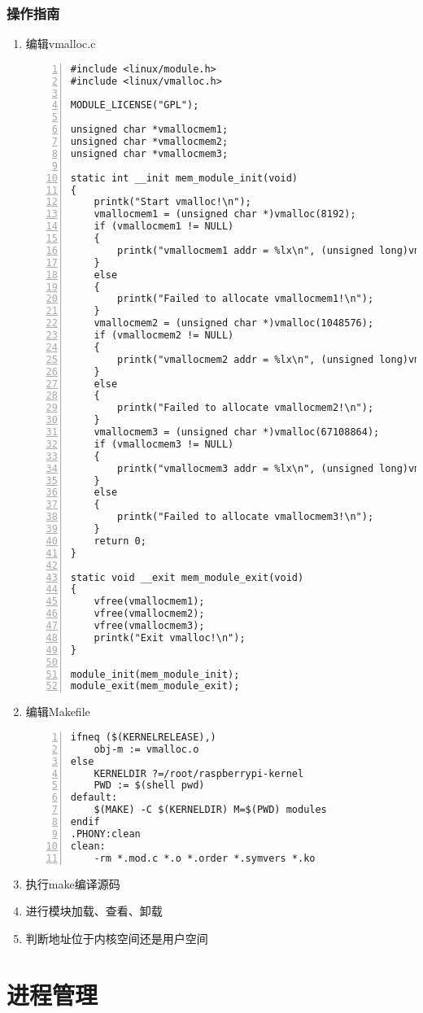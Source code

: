 \documentclass{article}
\begin{document}
\subsubsection{操作指南}
\begin{enumerate}
    \item 编辑vmalloc.c
\begin{lstlisting}[numbers=left]
#include <linux/module.h>
#include <linux/vmalloc.h>

MODULE_LICENSE("GPL");

unsigned char *vmallocmem1;
unsigned char *vmallocmem2;
unsigned char *vmallocmem3;

static int __init mem_module_init(void)
{
	printk("Start vmalloc!\n");
	vmallocmem1 = (unsigned char *)vmalloc(8192);
	if (vmallocmem1 != NULL)
	{
		printk("vmallocmem1 addr = %lx\n", (unsigned long)vmallocmem1);
	}
	else
	{
		printk("Failed to allocate vmallocmem1!\n");
	}
	vmallocmem2 = (unsigned char *)vmalloc(1048576);
	if (vmallocmem2 != NULL)
	{
		printk("vmallocmem2 addr = %lx\n", (unsigned long)vmallocmem2);
	}
	else
	{
		printk("Failed to allocate vmallocmem2!\n");
	}
	vmallocmem3 = (unsigned char *)vmalloc(67108864);
	if (vmallocmem3 != NULL)
	{
		printk("vmallocmem3 addr = %lx\n", (unsigned long)vmallocmem3);
	}
	else
	{
		printk("Failed to allocate vmallocmem3!\n");
	}
	return 0;
}

static void __exit mem_module_exit(void)
{
	vfree(vmallocmem1);
	vfree(vmallocmem2);
	vfree(vmallocmem3);
	printk("Exit vmalloc!\n");
}

module_init(mem_module_init);
module_exit(mem_module_exit);

\end{lstlisting}
    \item 编辑Makefile
\begin{lstlisting}[numbers=left]
ifneq ($(KERNELRELEASE),)
	obj-m := vmalloc.o
else
	KERNELDIR ?=/root/raspberrypi-kernel
	PWD := $(shell pwd)
default:
	$(MAKE) -C $(KERNELDIR) M=$(PWD) modules
endif
.PHONY:clean
clean:
	-rm *.mod.c *.o *.order *.symvers *.ko
\end{lstlisting}
    \item 执行make编译源码
    \item 进行模块加载、查看、卸载
    \item 判断地址位于内核空间还是用户空间
\end{enumerate}

\newpage



\section{进程管理}
\end{document}
